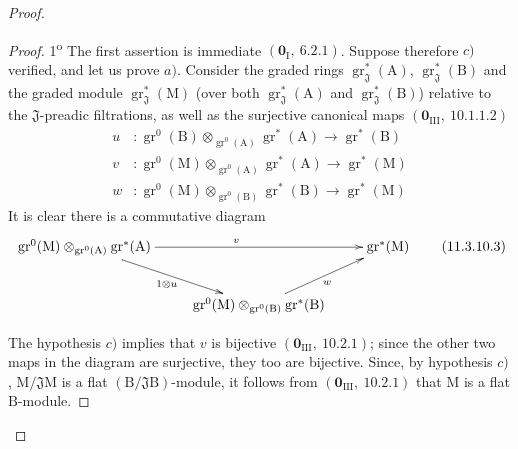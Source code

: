\begin{proof}
\begin{proof}
1\textsuperscript{o} The first assertion is immediate $(\mathbf{0}_\mathrm{I},~6.2.1)$. Suppose therefore $c)$ verified, and let us prove $a)$. Consider the graded rings $\operatorname{gr}^*_\mathfrak{J}(\mathrm{A})$, $\operatorname{gr}^*_\mathfrak{J}(\mathrm{B})$ and the graded module $\operatorname{gr}^*_\mathfrak{J}(\mathrm{M})$ (over both $\operatorname{gr}^*_\mathfrak{J}(\mathrm{A})$ and $\operatorname{gr}^*_\mathfrak{J}(\mathrm{B})$) relative to the $\mathfrak{J}$-preadic filtrations, as well as the surjective canonical maps $(\mathbf{0}_{\mathrm{III}},~10.1.1.2)$
\begin{align*}
  u &: \operatorname{gr}^0(\mathrm{B})\otimes_{\operatorname{gr}^0(\mathrm{A})}\operatorname{gr}^*(\mathrm{A})\to\operatorname{gr}^*(\mathrm{B}) \\
  v &: \operatorname{gr}^0(\mathrm{M})\otimes_{\operatorname{gr}^0(\mathrm{A})}\operatorname{gr}^*(\mathrm{A})\to\operatorname{gr}^*(\mathrm{M}) \\
  w &: \operatorname{gr}^0(\mathrm{M})\otimes_{\operatorname{gr}^0(\mathrm{B})}\operatorname{gr}^*(\mathrm{B})\to\operatorname{gr}^*(\mathrm{M})
\end{align*}
It is clear there is a commutative diagram
\begin{equation}
\xymatrix{
  \operatorname{gr}^0(\mathrm{M})\otimes_{\operatorname{gr}^0(\mathrm{A})}\operatorname{gr}^*(\mathrm{A}) \ar[rr]^{v} \ar[dr]_{1\otimes u} & & \operatorname{gr}^*(\mathrm{M}) \\
  & \operatorname{gr}^0(\mathrm{M})\otimes_{\operatorname{gr}^0(\mathrm{B})}\operatorname{gr}^*(\mathrm{B}) \ar[ur]_{w} &
}
  \label{IV.11.3.10.3}
\tag{11.3.10.3}
\end{equation}

The hypothesis $c)$ implies that $v$ is bijective $(\mathbf{0}_{\mathrm{III}},~10.2.1)$; since the other two maps in the diagram are surjective, they too are bijective. Since, by hypothesis $c)$, $\mathrm{M}/\mathfrak{J}\mathrm{M}$ is a flat $(\mathrm{B}/\mathfrak{J}\mathrm{B})$-module, it follows from $(\mathbf{0}_{\mathrm{III}},~10.2.1)$ that $\mathrm{M}$ is a flat $\mathrm{B}$-module.


\end{proof}
\end{proof}
